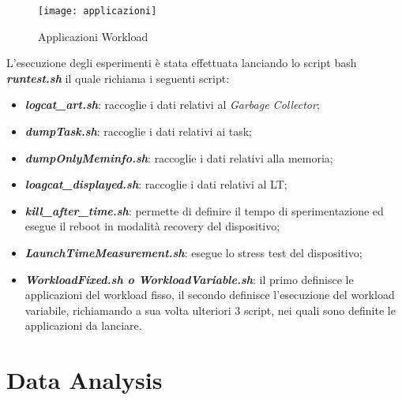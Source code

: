 \begin{figure}[!htbp]
  \centering
  \texttt{[image: applicazioni]}
  \caption{Applicazioni Workload}
  \label{applicazioni}
\end{figure}

L'esecuzione degli esperimenti è stata effettuata lanciando lo script bash
\textit{\textbf{runtest.sh}} il quale richiama i seguenti script:
  \begin{itemize}
    \item \textit{\textbf{logcat\_art.sh}}: raccoglie i dati relativi al \textit{Garbage Collector};
    \item \textit{\textbf{dumpTask.sh}}: raccoglie i dati relativi ai task;
    \item \textit{\textbf{dumpOnlyMeminfo.sh}}: raccoglie i dati relativi alla memoria;
    \item \textit{\textbf{loagcat\_displayed.sh}}: raccoglie i dati relativi al LT;
    \item \textit{\textbf{kill\_after\_time.sh}}: permette di definire il tempo di
    sperimentazione ed esegue il reboot in modalità recovery del dispositivo;
    \item \textit{\textbf{LaunchTimeMeasurement.sh}}: esegue lo stress test del dispositivo;
    \item \textit{\textbf{WorkloadFixed.sh o WorkloadVariable.sh}}: il primo definisce le applicazioni del
    workload fisso, il secondo definisce l'esecuzione del workload variabile, richiamando
    a sua volta ulteriori 3 script, nei quali sono definite le applicazioni da lanciare.
  \end{itemize}

\section{Data Analysis}

